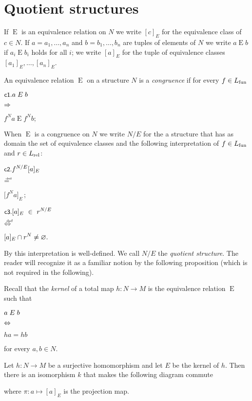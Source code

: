 \documentclass[creche.tex]{subfiles}
\begin{document}
\section{Quotient structures}\label{quotient}
\def\ceq#1#2#3{\parbox[b]{20ex}{$\displaystyle #1$}\parbox[b]{6ex}{\hfil$#2$}$\displaystyle #3$}


If $\mathrel{E}$ is an equivalence relation on $N$ we write \emph{$[c]_E$\/} for the equivalence class of $c\in N$. If $a=a_1,\dots,a_n$ and $b=b_1,\dots,b_n$ are tuples of elements of $N$ we write \emph{$a\mathrel{E} b$\/} if $a_i\mathrel{E} b_i$ holds for all $i$; we write \emph{$[a]_E$\/} for the tuple of equivalence classes $[a_1]_E,\dots,[a_n]_E$. 

An equivalence relation $\mathrel{E}$ on a structure $N$ is a \emph{congruence\/} if for every $f\in L_{\rm fun}$

\ceq{\ssf{c1}.\hfill a\mathrel{E} b}{\IMP}{f^N a\mathrel{E} f^N b;}

When $\mathrel{E}$ is a congruence on $N$ we write \emph{$N/E$\/} for the a structure that has as domain the set of equivalence classes and the following interpretation of $f\in L_{\rm fun}$ and $r\in L_{\rm rel}$:

\ceq{\ssf{c2.}\hfill f^{N/E}[a]_E}{\deq}{\big[f^N a\big]_E\,;}

\ceq{\ssf{c3.}\hfill [a]_E\ \in\ r^{N/E}}{\dIFF}{[a]_E\cap r^{N}\neq\0.}

By  this interpretation is well-defined. We call $N/E$ the \emph{quotient structure}. The reader will recognize it as a familiar notion by the following proposition (which is not required in the following).

Recall that the \emph{kernel\/} of a total map $h:N\to M$ is the equivalence relation $\mathrel{E}$ such that

\ceq{\hfill a\mathrel{E} b}{\IFF}{ha=hb} 

for every $a,b\in N$.

\begin{proposition}
Let $h:N\to M$ be a surjective homomorphism and let $E$ be the kernel of $h$. Then there is an isomorphism $k$ that makes the following diagram commute


\hspace*{25ex}

where $\pi:a\mapsto [a]_E$ is the projection map.\QED
\end{proposition}
\end{document}
